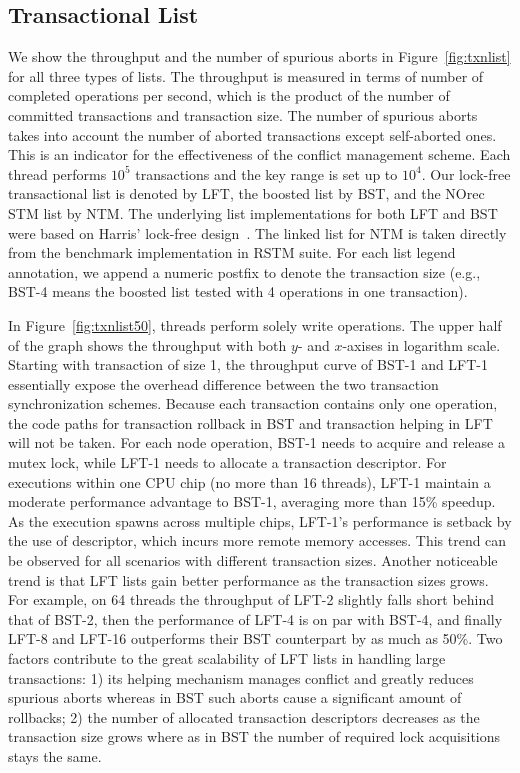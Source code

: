 \documentclass[]{sig-alternate-05-2015}
\begin{document}
\subsection{Transactional List}
\label{sec:txnlistexp}
We show the throughput and the number of spurious aborts in Figure~\ref{fig:txnlist} for all three types of lists.
The throughput is measured in terms of number of completed operations per second, which is the product of the number of committed transactions and transaction size.
The number of spurious aborts takes into account the number of aborted transactions except self-aborted ones.
This is an indicator for the effectiveness of the conflict management scheme.
Each thread performs $10^5$ transactions and the key range is set up to $10^4$.
Our lock-free transactional list is denoted by LFT, the boosted list by BST, and the NOrec STM list by NTM. 
The underlying list implementations for both LFT and BST were based on Harris' lock-free design~\cite{harris2001pragmatic}.
The linked list for NTM is taken directly from the benchmark implementation in RSTM suite.
For each list legend annotation, we append a numeric postfix to denote the transaction size (e.g., BST-4 means the boosted list tested with 4 operations in one transaction). 

In Figure~\ref{fig:txnlist50}, threads perform solely write operations.
The upper half of the graph shows the throughput with both $y$- and $x$-axises in logarithm scale.
Starting with transaction of size 1, the throughput curve of BST-1 and LFT-1 essentially expose the overhead difference between the two transaction synchronization schemes.
Because each transaction contains only one operation, the code paths for transaction rollback in BST and transaction helping in LFT will not be taken.
For each node operation, BST-1 needs to acquire and release a mutex lock, while LFT-1 needs to allocate a transaction descriptor.
For executions within one CPU chip (no more than 16 threads), LFT-1 maintain a moderate performance advantage to BST-1, averaging more than 15\% speedup.
As the execution spawns across multiple chips, LFT-1's performance is setback by the use of descriptor, which incurs more remote memory accesses.
This trend can be observed for all scenarios with different transaction sizes.
Another noticeable trend is that LFT lists gain better performance as the transaction sizes grows.
For example, on 64 threads the throughput of LFT-2 slightly falls short behind that of BST-2, then the performance of LFT-4 is on par with BST-4, and finally LFT-8 and LFT-16 outperforms their BST counterpart by as much as 50\%.
Two factors contribute to the great scalability of LFT lists in handling large transactions: 1) its helping mechanism manages conflict and greatly reduces spurious aborts whereas in BST such aborts cause a significant amount of rollbacks; 2) the number of allocated transaction descriptors decreases as the transaction size grows where as in BST the number of required lock acquisitions stays the same.
\end{document}
